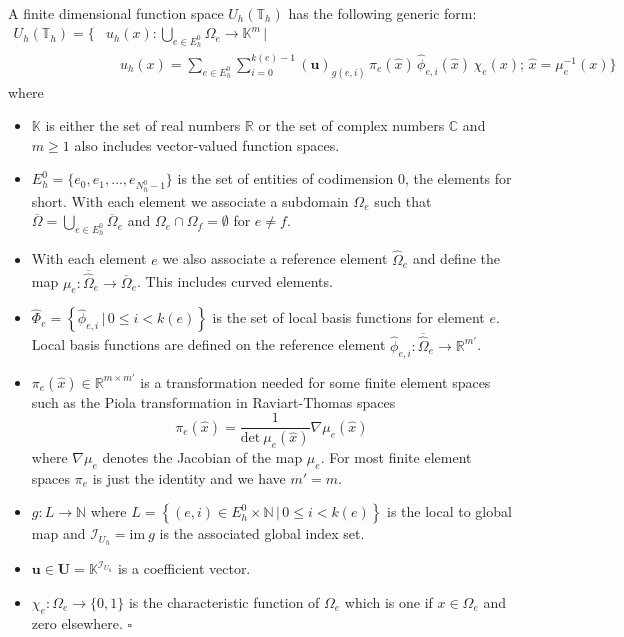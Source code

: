 \begin{definition}\label{Def:Vh}
 A finite dimensional function space $U_h(\mathbb{T}_h)$ has the
 following generic form: 
\begin{equation}\label{Eq:GenericFESpace}
\begin{split}
U_h(\mathbb{T}_h) = \Biggl\{ & u_h(x) : \bigcup_{e\in E_h^0}\Omega_e
 \to \mathbb{K}^m\,\Bigg| \\
&\quad u_h(x) = \sum_{e\in E_h^0}\sum_{i=0}^{k(e)-1} (\mathbf{u})_{g(e,i)}
\, \pi_e(\hat{x}) \, \hat\phi_{e,i}(\hat{x}) \, \chi_e(x); \, \hat{x}=\mu_e^{-1}(x) 
 \Biggr\}
\end{split}
\end{equation}
where
\begin{itemize}
\item $\mathbb{K}$ is either the set of real numbers $\mathbb{R}$ or
  the set of complex numbers $\mathbb{C}$ and $m\geq 1$ also includes
  vector-valued function spaces. 
\item $E_h^0=\{e_0, e_1, \ldots, e_{N_h^0-1}\}$ is the set of entities of
codimension 0, the elements for short. With each element we
associate a subdomain $\Omega_e$ such that $\overline{\Omega}
= \bigcup_{e\in E_h^0} \overline{\Omega}_e$ and $\Omega_e\cap\Omega_f=\emptyset$ for $e\neq f$. 
\item With each element $e$ we also associate a reference element
  $\hat\Omega_e$ and define the map $\mu_e : \overline{\hat\Omega}_e \to
  \overline{\Omega}_e$. This includes curved elements.
\item $\hat\Phi_e = \left\{\hat\phi_{e,i}\,|\,0\leq i < k(e)\right\}$ is
  the set of local basis functions for element $e$. Local basis
  functions are defined on the reference element $\hat\phi_{e,i} :
  \overline{\hat\Omega}_e \to \mathbb{R}^{m'}$.
\item $\pi_e(\hat{x})\in\mathbb{R}^{m\times m'}$ is a transformation
  needed for some finite element spaces such as the Piola
  transformation \cite{BrezziFortin} in Raviart-Thomas spaces
\begin{equation*}
\pi_e(\hat{x}) = \frac{1}{\text{det}\  \mu_e(\hat{x})} \nabla \mu_e(\hat{x})
\end{equation*}
where $\nabla \mu_e$ denotes the Jacobian of the map $\mu_e$. For most
finite element spaces $\pi_e$ is just the identity and we have $m'=m$.
\item $g : L \to \mathbb{N}$ where $L=\left\{ (e,i)\in E_h^0 \times
  \mathbb{N} \,|\, 0\leq i < k(e)\right\}$ is the local to global map
  and $\mathcal{I}_{U_h} = \text{im}\ g$ is the associated global index set.
\item $\mathbf{u}\in \mathbf{U}=\mathbb{K}^{\mathcal{I}_{U_h}}$ is a coefficient vector.
\item $\chi_e : \Omega_e \to \{0,1\}$ is the characteristic function
  of $\Omega_e$ which is one if $x\in\Omega_e$ and zero elsewhere. 
\hfill$\square$
\end{itemize}
\end{definition}

